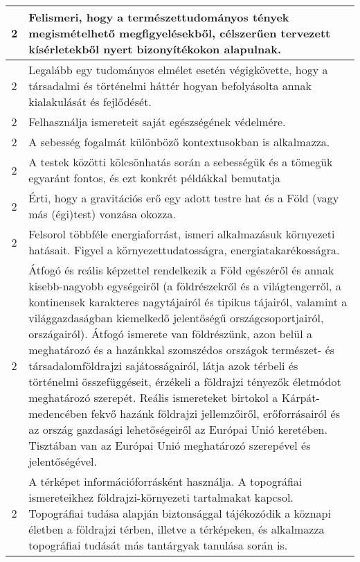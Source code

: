 \begin{longtable}{c | p{12cm} }
                                
                                          2 &  Felismeri, hogy a természettudományos tények megismételhető megfigyelésekből, célszerűen tervezett kísérletekből nyert bizonyítékokon alapulnak. \\ \hline
                                          2 &  Legalább egy tudományos elmélet esetén végigkövette, hogy a társadalmi és történelmi háttér hogyan befolyásolta annak kialakulását és fejlődését. \\ \hline
                                          2 &  Felhasználja ismereteit saját egészségének védelmére. \\ \hline
                                          2 &  A sebesség fogalmát különböző kontextusokban is alkalmazza. \\ \hline
                                          2 &  A testek közötti kölcsönhatás során a sebességük és a tömegük egyaránt fontos, és ezt konkrét példákkal bemutatja \\ \hline
                                          2 &  Érti, hogy a gravitációs erő egy adott testre hat és a Föld (vagy más (égi)test) vonzása okozza. \\ \hline
                                          2 &  Felsorol többféle energiaforrást, ismeri alkalmazásuk környezeti hatásait. Figyel a környezettudatosságra, energiatakarékosságra. \\ \hline
                                          2 &  Átfogó és reális képzettel rendelkezik a Föld egészéről és annak kisebb-nagyobb egységeiről (a földrészekről és a világtengerről, a kontinensek karakteres nagytájairól és tipikus tájairól, valamint a világgazdaságban kiemelkedő jelentőségű országcsoportjairól, országairól). Átfogó ismerete van földrészünk, azon belül a meghatározó és a hazánkkal szomszédos országok természet- és társadalomföldrajzi sajátosságairól, látja azok térbeli és történelmi összefüggéseit, érzékeli a földrajzi tényezők életmódot meghatározó szerepét. Reális ismereteket birtokol a Kárpát-medencében fekvő hazánk földrajzi jellemzőiről, erőforrásairól és az ország gazdasági lehetőségeiről az Európai Unió keretében. Tisztában van az Európai Unió meghatározó szerepével és jelentőségével. \\ \hline
                                          2 &  A térképet információforrásként használja. A topográfiai ismereteikhez földrajzi-környezeti tartalmakat kapcsol. Topográfiai tudása alapján biztonsággal tájékozódik a köznapi életben a földrajzi térben, illetve a térképeken, és alkalmazza topográfiai tudását más tantárgyak tanulása során is. \\ \hline

\end{longtable}
